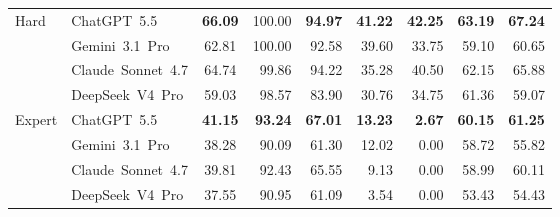 \begin{table}[!htbp]
{\begin{tabular}{@{}llcrrrrrr@{}}
        Hard & ChatGPT~5.5
        & \textbf{66.09} & 100.00 & \textbf{94.97} & \textbf{41.22}
        & \textbf{42.25} & \textbf{63.19} & \textbf{67.24} \\
        & Gemini~3.1~Pro
        & 62.81 & 100.00 & 92.58 & 39.60 & 33.75 & 59.10 & 60.65 \\
        & Claude~Sonnet~4.7
        & 64.74 & 99.86 & 94.22 & 35.28 & 40.50 & 62.15 & 65.88 \\
        & DeepSeek~V4~Pro
        & 59.03 & 98.57 & 83.90 & 30.76 & 34.75 & 61.36 & 59.07 \\
        \addlinespace

        Expert & ChatGPT~5.5
        & \textbf{41.15} & \textbf{93.24} & \textbf{67.01} & \textbf{13.23}
        & \textbf{2.67} & \textbf{60.15} & \textbf{61.25} \\
        & Gemini~3.1~Pro
        & 38.28 & 90.09 & 61.30 & 12.02 & 0.00 & 58.72 & 55.82 \\
        & Claude~Sonnet~4.7
        & 39.81 & 92.43 & 65.55 & 9.13 & 0.00 & 58.99 & 60.11 \\
        & DeepSeek~V4~Pro
        & 37.55 & 90.95 & 61.09 & 3.54 & 0.00 & 53.43 & 54.43 \\
        \bottomrule
    \end{tabular}%
    }
\end{table}
